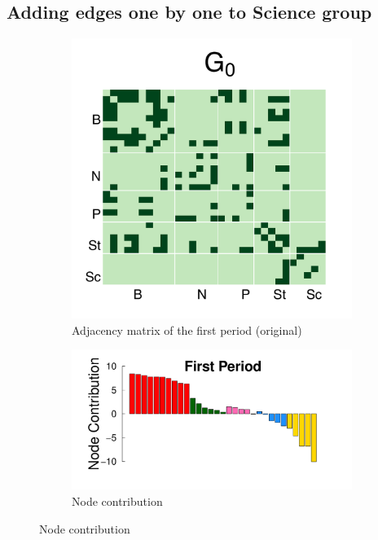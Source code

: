 \documentclass[12pt]{article}
\begin{document}
\subsection*{Adding edges one by one to Science group}
\begin{figure}[h]
	\centering
	\begin{subfigure}[b]{0.3\textwidth}
		\includegraphics[width=\textwidth]{../../Figure/sim_Adj0.pdf}
		\caption{Adjacency matrix of the first period (original)}
		\label{fig:step0}
	\end{subfigure}
	\begin{subfigure}[b]{0.6\textwidth}
		\includegraphics[width=\textwidth]{../../Figure/step0.pdf}
		\caption{Node contribution}
		\label{fig:adj.step0}
	\end{subfigure}
\end{figure}
\end{document}
